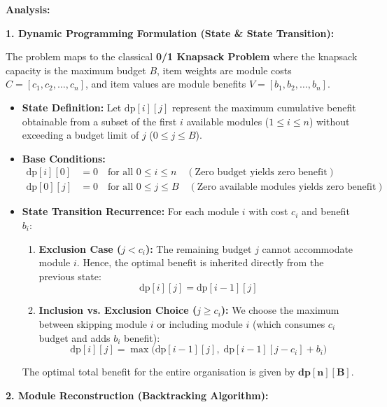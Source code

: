 \documentclass[12pt]{article}
\begin{document}
\newpage

\textbf{Analysis:}

\textbf{1. Dynamic Programming Formulation (State \& State Transition):}

The problem maps to the classical \textbf{0/1 Knapsack Problem} where the knapsack capacity is the maximum budget $B$, item weights are module costs $C = [c_1, c_2, \dots, c_n]$, and item values are module benefits $V = [b_1, b_2, \dots, b_n]$.

\begin{itemize}
    \item \textbf{State Definition:} Let $\text{dp}[i][j]$ represent the maximum cumulative benefit obtainable from a subset of the first $i$ available modules ($1 \le i \le n$) without exceeding a budget limit of $j$ ($0 \le j \le B$).
    \item \textbf{Base Conditions:}
    \begin{align*}
        \text{dp}[i][0] &= 0 \quad \text{for all } 0 \le i \le n \quad (\text{Zero budget yields zero benefit}) \\
        \text{dp}[0][j] &= 0 \quad \text{for all } 0 \le j \le B \quad (\text{Zero available modules yields zero benefit})
    \end{align*}
    \item \textbf{State Transition Recurrence:}
    For each module $i$ with cost $c_i$ and benefit $b_i$:
    \begin{enumerate}
        \item \textbf{Exclusion Case ($j < c_i$):} The remaining budget $j$ cannot accommodate module $i$. Hence, the optimal benefit is inherited directly from the previous state:
        \[
        \text{dp}[i][j] = \text{dp}[i-1][j]
        \]
        \item \textbf{Inclusion vs. Exclusion Choice ($j \ge c_i$):} We choose the maximum between skipping module $i$ or including module $i$ (which consumes $c_i$ budget and adds $b_i$ benefit):
        \[
        \text{dp}[i][j] = \max\Big(\text{dp}[i-1][j], \; \text{dp}[i-1][j - c_i] + b_i\Big)
        \]
    \end{enumerate}
    The optimal total benefit for the entire organisation is given by $\mathbf{\text{dp}[n][B]}$.
\end{itemize}

\textbf{2. Module Reconstruction (Backtracking Algorithm):}
\end{document}
